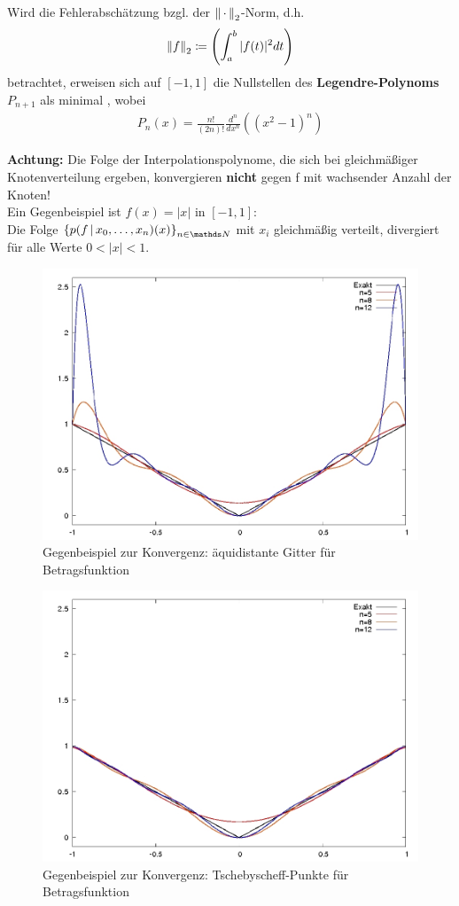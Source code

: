 Wird die Fehlerabschätzung bzgl. der 
$\left\| \,\cdot\, \right\|_2$-Norm,
d.h. 
\begin{gather*}
  \left\| f \right\|_2\coloneqq \left(\int_{a}^{b}|f(t)|^2dt  \right)
\end{gather*}
betrachtet, erweisen sich auf $[-1,1]$ die Nullstellen
des \textbf{Legendre-Polynoms} $P_{n+1}$
als minimal \cite{haemmerlinhoffmann}, wobei
\begin{gather*}
  P_n(x) = \frac{n!}{(2n)!}\frac{d^n}{dx^n}\left((x^2-1)^n\right)
\end{gather*}


\textbf{Achtung:} Die Folge der Interpolationspolynome,
die sich bei gleichmäßiger Knotenverteilung ergeben,
konvergieren \textbf{nicht} gegen f mit wachsender Anzahl der Knoten!\\
Ein Gegenbeispiel ist $f(x)=|x|$ in $[-1,1]$:\\
Die Folge $\left\{p(f\,|\,x_0,\dots,x_n)(x)\right\}_{n\in\N}$
mit $x_i$ gleichmäßig verteilt,
divergiert für alle Werte $0<|x|<1$.

\begin{figure}
  \centering
  \includegraphics[width=0.5\linewidth]{images/afg49aequi.jpg}
  \caption{Gegenbeispiel zur Konvergenz: äquidistante Gitter für Betragsfunktion}
  \label{6.1.20im1}
\end{figure}
\begin{figure}[t!b]
  \centering
  \includegraphics[width=0.5\linewidth]{images/afg49tscheby.jpeg}
  \caption{Gegenbeispiel zur Konvergenz: Tschebyscheff-Punkte für Betragsfunktion}
  \label{6.1.20im2}
\end{figure}

